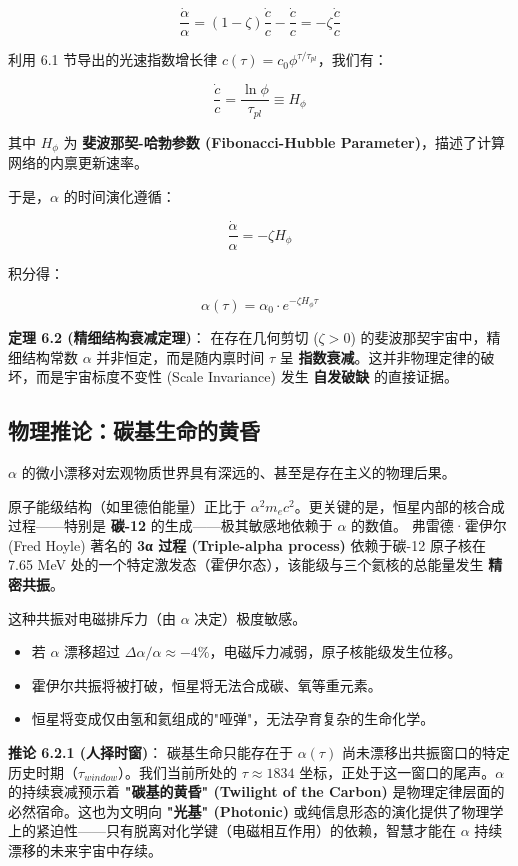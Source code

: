 \[\frac{\dot{\alpha}}{\alpha} = (1 - \zeta) \frac{\dot{c}}{c} - \frac{\dot{c}}{c} = -\zeta \frac{\dot{c}}{c}\]

利用 6.1 节导出的光速指数增长律 $c(\tau) = c_0 \phi^{\tau/\tau_{pl}}$，我们有：

\[\frac{\dot{c}}{c} = \frac{\ln \phi}{\tau_{pl}} \equiv H_\phi\]

其中 $H_\phi$ 为 \textbf{斐波那契-哈勃参数 (Fibonacci-Hubble Parameter)}，描述了计算网络的内禀更新速率。

于是，$\alpha$ 的时间演化遵循：

\[\frac{\dot{\alpha}}{\alpha} = -\zeta H_\phi\]

积分得：

\[\alpha(\tau) = \alpha_0 \cdot e^{-\zeta H_\phi \tau}\]

\textbf{定理 6.2 (精细结构衰减定理)}：
在存在几何剪切 ($\zeta > 0$) 的斐波那契宇宙中，精细结构常数 $\alpha$ 并非恒定，而是随内禀时间 $\tau$ 呈 \textbf{指数衰减}。这并非物理定律的破坏，而是宇宙标度不变性 (Scale Invariance) 发生 \textbf{自发破缺} 的直接证据。

\subsection{物理推论：碳基生命的黄昏}

$\alpha$ 的微小漂移对宏观物质世界具有深远的、甚至是存在主义的物理后果。

原子能级结构（如里德伯能量）正比于 $\alpha^2 m_e c^2$。更关键的是，恒星内部的核合成过程——特别是 \textbf{碳-12} 的生成——极其敏感地依赖于 $\alpha$ 的数值。
弗雷德·霍伊尔 (Fred Hoyle) 著名的 \textbf{3α 过程 (Triple-alpha process)} 依赖于碳-12 原子核在 7.65 MeV 处的一个特定激发态（霍伊尔态），该能级与三个氦核的总能量发生 \textbf{精密共振}。

这种共振对电磁排斥力（由 $\alpha$ 决定）极度敏感。

\begin{itemize}
\item 若 $\alpha$ 漂移超过 $\Delta \alpha / \alpha \approx -4\%$，电磁斥力减弱，原子核能级发生位移。
\item 霍伊尔共振将被打破，恒星将无法合成碳、氧等重元素。
\item 恒星将变成仅由氢和氦组成的"哑弹"，无法孕育复杂的生命化学。
\end{itemize}

\textbf{推论 6.2.1 (人择时窗)}：
碳基生命只能存在于 $\alpha(\tau)$ 尚未漂移出共振窗口的特定历史时期（$\tau_{window}$）。我们当前所处的 $\tau \approx 1834$ 坐标，正处于这一窗口的尾声。$\alpha$ 的持续衰减预示着 \textbf{"碳基的黄昏" (Twilight of the Carbon)} 是物理定律层面的必然宿命。这也为文明向 \textbf{"光基" (Photonic)} 或纯信息形态的演化提供了物理学上的紧迫性——只有脱离对化学键（电磁相互作用）的依赖，智慧才能在 $\alpha$ 持续漂移的未来宇宙中存续。
